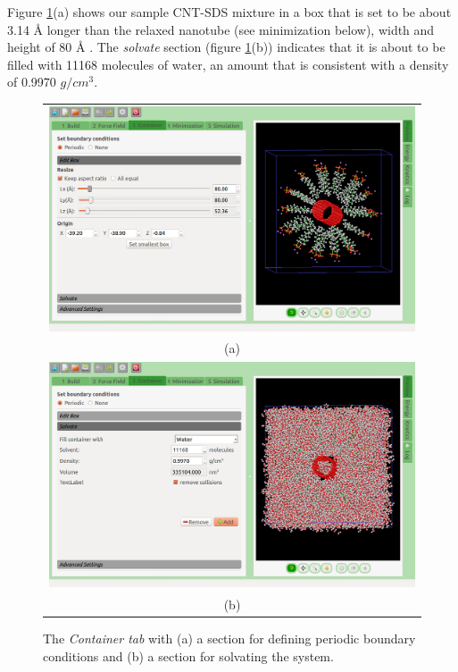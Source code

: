 \documentclass{article}
\begin{document}
Figure \ref{fig:setupTab}(a) shows our sample CNT-SDS mixture in a box that is set to be about 3.14 {\AA}  longer than the relaxed nanotube (see minimization below), width and height of 80 {\AA} .  The \textit{solvate} section (figure \ref{fig:setupTab}(b)) indicates that it is about to be filled with 11168 molecules of  water, an amount that is consistent with a density of 0.9970 $g/cm^3$.


\begin{figure}
\begin{center}
  \begin{tabular}{c}
  \includegraphics[scale=0.4]{setupTabA.png} \\
     (a)\\
  \includegraphics[scale=0.4]{setupTabB.png} \\
     (b) \\
  \end{tabular}
  \caption{The \textit{Container tab} with (a) a section for defining periodic boundary conditions and (b) a section for solvating the system.}

\end{center}
  \label{fig:setupTab}
\end{figure}
\end{document}
